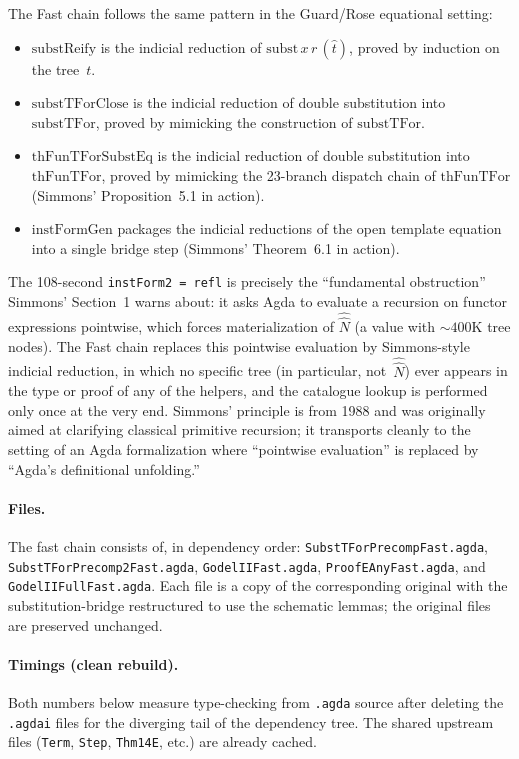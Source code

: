 \documentclass[11pt]{article}
\newcommand{\reify}[1]{\widehat{#1}}
\newcommand{\thFunTFor}{\mathrm{thFunTFor}}
\begin{document}
The Fast chain follows the same pattern in the Guard/Rose
equational setting:
\begin{itemize}
\item $\mathrm{substReify}$ is the indicial reduction of
  $\mathrm{subst}\,x\,r\,(\reify{t})$, proved by induction on
  the tree~$t$.
\item $\mathrm{substTForClose}$ is the indicial reduction of
  double substitution into $\mathrm{substTFor}$, proved by
  mimicking the construction of $\mathrm{substTFor}$.
\item $\mathrm{thFunTForSubstEq}$ is the indicial reduction of
  double substitution into $\thFunTFor$, proved by mimicking
  the 23-branch dispatch chain of $\thFunTFor$ (Simmons'
  Proposition~5.1 in action).
\item $\mathrm{instFormGen}$ packages the indicial reductions of
  the open template equation into a single bridge step
  (Simmons' Theorem~6.1 in action).
\end{itemize}
The 108-second \texttt{instForm2 = refl} is precisely the
``fundamental obstruction'' Simmons' Section~1 warns about: it
asks Agda to evaluate a recursion on functor expressions
pointwise, which forces materialization of $\reify{\hat{N}}$
(a value with ${\sim}400\mathrm{K}$ tree nodes).  The Fast
chain replaces this pointwise evaluation by Simmons-style
indicial reduction, in which no specific tree (in particular,
not~$\reify{\hat{N}}$) ever appears in the type or proof of
any of the helpers, and the catalogue lookup is performed
only once at the very end.  Simmons' principle is from 1988
and was originally aimed at clarifying classical primitive
recursion; it transports cleanly to the setting of an Agda
formalization where ``pointwise evaluation'' is replaced by
``Agda's definitional unfolding.''

\paragraph{Files.}
The fast chain consists of, in dependency order:
\texttt{SubstTForPrecompFast.agda},
\texttt{SubstTForPrecomp2Fast.agda},
\texttt{GodelIIFast.agda},
\texttt{ProofEAnyFast.agda}, and
\texttt{GodelIIFullFast.agda}.
Each file is a copy of the corresponding original with the
substitution-bridge restructured to use the schematic lemmas;
the original files are preserved unchanged.

\paragraph{Timings (clean rebuild).}
Both numbers below measure type-checking from \texttt{.agda}
source after deleting the \texttt{.agdai} files for the diverging
tail of the dependency tree.  The shared upstream files
(\texttt{Term}, \texttt{Step}, \texttt{Thm14E}, etc.) are
already cached.
\end{document}
